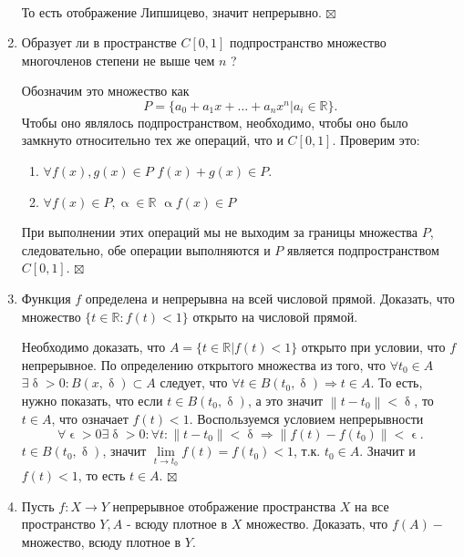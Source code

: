 \documentclass[a4paper, 12pt]{report}
\newenvironment{Proof} %
{\par\noindent{$\blacklozenge$}} %
{\hfill$\scriptstyle\boxtimes$}
\newcommand{\Rm}{\mathbb{R}}
\renewcommand{\alpha}{\upalpha}
\renewcommand{\delta}{\updelta}
\renewcommand{\epsilon}{\upvarepsilon}
\newcommand\Norm[1]{\left\| #1 \right\|}
\begin{document}
\begin{enumerate}
\begin{Proof}
\begin{multline*}
		\end{multline*}
		То есть отображение Липшицево, значит непрерывно.
		\end{Proof}
		\item Образует ли в пространстве $C[0,1]$ подпространство множество многочленов степени не выше чем $n$ ?
		\begin{Proof}
			Обозначим это множество как $$P = \{a_0 + a_1x + \ldots + a_nx^n | a_i \in \Rm\}.$$
		Чтобы оно являлось подпространством, необходимо, чтобы оно было замкнуто относительно тех же операций, что и $C[0,1]$. Проверим это:\begin{enumerate}
			\item $\forall f(x), g(x) \in P$ $f(x) + g(x) \in P$.
			\item $\forall f(x) \in P, \alpha \in \Rm$ $\alpha f(x) \in P$
		\end{enumerate}
		При выполнении этих операций мы не выходим за границы множества $P$, следовательно, обе операции выполняются и $P$ является подпространством $C[0,1]$.
		\end{Proof}
		\item Функция $f$ определена и непрерывна на всей числовой прямой. Доказать, что множество $\{t \in \mathbb{R}: f(t)<1\}$ открыто на числовой прямой.
		\begin{Proof}
			Необходимо доказать, что $A = \{t \in \Rm | f(t) < 1\}$ открыто при условии, что $f$ непрерывное. По определению открытого множества из того, что $\forall t_0 \in A$ $\exists \delta > 0: B(x, \delta)\subset A$ следует, что $\forall t \in B(t_0, \delta) \Rightarrow t \in A$. То есть, нужно показать, что если $t \in B(t_0, \delta)$, а это значит $\Norm{t -t_0} < \delta$, то $t \in A$, что означает $f(t) < 1$. Воспользуемся условием непрерывности $$\forall \epsilon > 0 \exists \delta > 0 : \forall t: {\Norm{t -t_0}< \delta} \Rightarrow \Norm{f(t)-f(t_0)}< \epsilon.$$
		$t \in B(t_0,\delta)$, значит $\lim\limits_{t\to t_0} f(t) = f(t_0) < 1$, т.к. $t_0 \in A$. Значит и $f(t) < 1$, то есть $t \in A$.
		\end{Proof}
		\item Пусть $f: X \rightarrow Y$ непрерывное отображение пространства $X$ на все пространство $Y, A$ - всюду плотное в $X$ множество. Доказать, что $f(A)-$ множество, всюду плотное в $Y$.
		

\end{enumerate}
\end{document}
